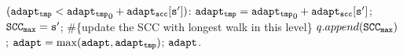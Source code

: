 \begin{algorithm}
\begin{algorithmic}[1]
    \STATE \qquad \qquad {} $(\mathtt{adapt_{tmp}} < \mathtt{adapt_{tmp}}_0 + \mathtt{adapt_{scc}[s']})$:
    \STATE \qquad \qquad \qquad \qquad $\mathtt{adapt_{tmp}} = \mathtt{adapt_{tmp}}_0 + \mathtt{adapt_{scc}[s']}$; 
    \STATE \qquad \qquad \qquad \qquad $\mathtt{SCC_{max} = s'} $; \#\{update the SCC with longest walk in this level\} 
    \STATE \qquad \qquad \qquad $q.append(\mathtt{SCC_{max}})$;
    \STATE \qquad $\mathtt{adapt} = \max(\mathtt{adapt}, \mathtt{adapt_{tmp}})$;    
    \RETURN $\mathtt{adapt}$.
    \end{algorithmic}
    \end{algorithm}

